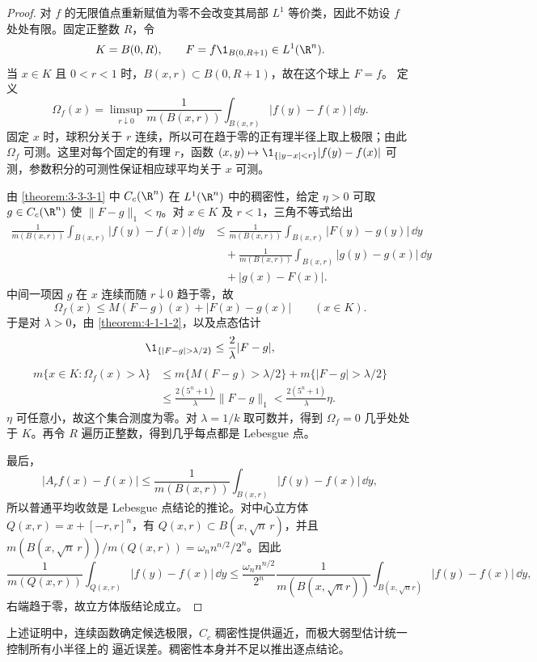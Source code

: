 \begin{proof}
对 $f$ 的无限值点重新赋值为零不会改变其局部 $L^1$ 等价类，因此不妨设 $f$ 处处有限。固定正整数
$R$，令
\[
 K=B(0,R),\qquad F=f\1_{B(0,R+1)}\in L^1(\R^n).
\]
当 $x\in K$ 且 $0<r<1$ 时，$B(x,r)\subset B(0,R+1)$，故在这个球上 $F=f$。
定义
\[
 \Omega_f(x)=\limsup_{r\downarrow0}\frac1{m(B(x,r))}
             \int_{B(x,r)}|f(y)-f(x)|\,\dd y.
\]
固定 $x$ 时，球积分关于 $r$ 连续，所以可在趋于零的正有理半径上取上极限；由此
$\Omega_f$ 可测。这里对每个固定的有理 $r$，函数
$(x,y)\mapsto\1_{\{|y-x|<r\}}|f(y)-f(x)|$ 可测，参数积分的可测性保证相应球平均关于 $x$ 可测。

由 \cref{theorem:3-3-3-1} 中 $C_c(\R^n)$ 在 $L^1(\R^n)$ 中的稠密性，给定 $\eta>0$ 可取
$g\in C_c(\R^n)$ 使 $\|F-g\|_1<\eta$。对 $x\in K$ 及 $r<1$，三角不等式给出
\[
 \begin{aligned}
 \frac1{m(B(x,r))}\int_{B(x,r)}|f(y)-f(x)|\,\dd y
 &\le \frac1{m(B(x,r))}\int_{B(x,r)}|F(y)-g(y)|\,\dd y\\
 &\quad+\frac1{m(B(x,r))}\int_{B(x,r)}|g(y)-g(x)|\,\dd y\\
 &\quad+|g(x)-F(x)|.
 \end{aligned}
\]
中间一项因 $g$ 在 $x$ 连续而随 $r\downarrow0$ 趋于零，故
\[
  \Omega_f(x)\le M(F-g)(x)+|F(x)-g(x)|\qquad(x\in K).
\]
于是对 $\lambda>0$，由 \cref{theorem:4-1-1-2}，以及点态估计
\[
  \1_{\{|F-g|>\lambda/2\}}\le \frac{2}{\lambda}|F-g|,
\]
\[
 \begin{aligned}
 m\{x\in K:\Omega_f(x)>\lambda\}
 &\le m\{M(F-g)>\lambda/2\}
      +m\{|F-g|>\lambda/2\}\\
 &\le \frac{2(5^n+1)}{\lambda}\|F-g\|_1
 <\frac{2(5^n+1)}{\lambda}\eta.
 \end{aligned}
\]
$\eta$ 可任意小，故这个集合测度为零。对 $\lambda=1/k$ 取可数并，得到
$\Omega_f=0$ 几乎处处于 $K$。再令 $R$ 遍历正整数，得到几乎每点都是 Lebesgue 点。

最后，
\[
 |A_rf(x)-f(x)|\le\frac1{m(B(x,r))}
       \int_{B(x,r)}|f(y)-f(x)|\,\dd y,
\]
所以普通平均收敛是 Lebesgue 点结论的推论。对中心立方体 $Q(x,r)=x+[-r,r]^n$，有
$Q(x,r)\subset B(x,\sqrt n\,r)$，并且
$m(B(x,\sqrt n\,r))/m(Q(x,r))=\omega_n n^{n/2}/2^n$。因此
\[
 \frac1{m(Q(x,r))}\int_{Q(x,r)}|f(y)-f(x)|\,\dd y
 \le \frac{\omega_n n^{n/2}}{2^n}
 \frac1{m(B(x,\sqrt n r))}
 \int_{B(x,\sqrt n r)}|f(y)-f(x)|\,\dd y,
\]
右端趋于零，故立方体版结论成立。
\end{proof}

上述证明中，连续函数确定候选极限，$C_c$ 稠密性提供逼近，而极大弱型估计统一控制所有小半径上的
逼近误差。稠密性本身并不足以推出逐点结论。

